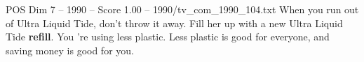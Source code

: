 \begin{textsample}{POS Dim 7 – 1990 – Score 1.00 – 1990/tv\_com\_1990\_104.txt}  \label{ex:f7_pos_069}
When you run out of Ultra Liquid Tide, don't throw it away.
Fill her up with a new Ultra Liquid Tide \textbf{refill}.
You 're using less plastic.
Less plastic is good for everyone, and saving money is good for you.

\end{textsample}
